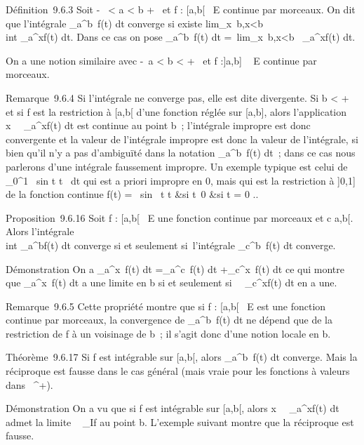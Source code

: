 \documentclass[]{article}
\begin{document}
Définition~9.6.3 Soit -\infty~ \textless{} a \textless{} b \leq +\infty~ et f :
{[}a,b{[}\rightarrow~ E continue par morceaux. On dit que l'intégrale
\int  \_a^b~f(t) dt converge si
existe
lim\_x\rightarrow~b,x\textless{}b~\\int
 \_a^xf(t) dt. Dans ce cas on pose
\int  \_a^b~f(t) dt
=\
lim\_x\rightarrow~b,x\textless{}b\int ~
\_a^xf(t) dt.

On a une notion similaire avec -\infty~\leq a \textless{} b \textless{} +\infty~ et f
:{]}a,b{]} \rightarrow~ E continue par morceaux.

Remarque~9.6.4 Si l'intégrale ne converge pas, elle est dite divergente.
Si b \textless{} +\infty~ et si f est la restriction à {[}a,b{[} d'une
fonction réglée sur {[}a,b{]}, alors l'application
x\mapsto~\int ~
\_a^xf(t) dt est continue au point b~; l'intégrale impropre
est donc convergente et la valeur de l'intégrale impropre est donc la
valeur de l'intégrale, si bien qu'il n'y a pas d'ambiguïté dans la
notation \int  \_a^b~f(t) dt~; dans
ce cas nous parlerons d'une intégrale faussement impropre. Un exemple
typique est celui de \int  \_0^1~
sin t \over t~ dt qui est a
priori impropre en 0, mais qui est la restriction à {]}0,1{]} de la
fonction continue f(t) = \left \
\cases  sin~ t
\over t &si t\neq~0
 &si t = 0 \cr 
\right ..

Proposition~9.6.16 Soit f : {[}a,b{[}\rightarrow~ E une fonction continue par
morceaux et c \in {[}a,b{[}. Alors l'intégrale \\int
 \_a^bf(t) dt converge si et seulement si~l'intégrale
\int  \_c^b~f(t) dt converge.

Démonstration On a \int  \_a^x~f(t)
dt =\int  \_a^c~f(t) dt
+\int  \_c^x~f(t) dt ce qui montre
que \int  \_a^x~f(t) dt a une
limite en b si et seulement si~\int ~
\_c^xf(t) dt en a une.

Remarque~9.6.5 Cette propriété montre que si f : {[}a,b{[}\rightarrow~ E est une
fonction continue par morceaux, la convergence de
\int  \_a^b~f(t) dt ne dépend que
de la restriction de f à un voisinage de b~; il s'agit donc d'une notion
locale en b.

Théorème~9.6.17 Si f est intégrable sur {[}a,b{[}, alors
\int  \_a^b~f(t) dt converge. Mais
la réciproque est fausse dans le cas général (mais vraie pour les
fonctions à valeurs dans \mathbb{R}~^+).

Démonstration On a vu que si f est intégrable sur {[}a,b{[}, alors
x\mapsto~\int ~
\_a^xf(t) dt admet la limite \int ~
\_If au point b. L'exemple suivant montre que la réciproque est
fausse.
\end{document}
